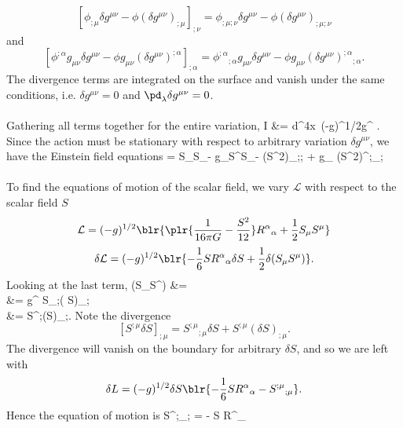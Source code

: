 \documentclass[10pt,letterpaper]{article}
\begin{document}
\[
	[\phi_{;\mu}\delta g^{\mu\nu}-\phi (\delta g^{\mu\nu})_{;\mu}]_{;\nu} = 
	\phi_{;\mu;\nu}\delta g^{\mu\nu}
	-\phi (\delta g^{\mu\nu})_{;\mu;\nu}
\]
and
\[
	[\phi^{;\alpha}g_{\mu\nu}\delta g^{\mu\nu} -\phi g_{\mu\nu}(\delta g^{\mu\nu})^{;\alpha}]_{;\alpha} = 
	\phi^{;\alpha}{}_{;\alpha}g_{\mu\nu}\delta g^{\mu\nu} - \phi g_{\mu\nu} (\delta g^{\mu\nu})^{;\alpha}{}_{;\alpha}.
\]
The divergence terms are integrated on the surface and vanish under the same conditions, i.e. $\delta g^{\mu\nu} = 0$ and $\pd_\lambda \delta g^{\mu\nu} = 0$. 
\\ \\
Gathering all terms together for the entire variation,
\ba
	\delta I &= \int d^4x\ (-g)^{1/2}\delta g^{\mu\nu}
	.
\ea
Since the action must be stationary with respect to arbitrary variation $\delta g^{\mu\nu}$, we 
have the Einstein field equations
\be
	 = S_\mu S_\nu -  g_{\mu\nu}S^\alpha S_\alpha-
	(S^2)_{;\mu;\nu} +  g_{\mu\nu} (S^2)^{;\alpha}{}_{;\alpha}\label{2}
\ee
\hrulefill \\ \\ 
To find the equations of motion of the scalar field, we vary $\mathcal L$ with respect to the scalar field $S$
\[
	\mathcal L = (-g)^{1/2}\blr{ \plr{ \frac{1}{16\pi G}-\frac{S^2}{12}}R^\alpha{}_\alpha +\frac12 S_\mu S^\mu}
\]
\[
	\delta \mathcal L = (-g)^{1/2}\blr{ -\frac16 SR^{\alpha}{}_\alpha\delta S+\frac12 \delta(S_\mu S^\mu)}.
\]
Looking at the last term,
\ba
	 \delta(S_\mu S^\mu) &= \delta {}\\
	&= g^{\mu\nu} S_{;\nu}( \delta S)_{;\mu}\\
	&=  S^{;\mu}(\delta S)_{;\mu}.
\ea
Note the divergence
\[
	[S^{;\mu} \delta S]_{;\mu} = S^{;\mu}{}_{;\mu}\delta S + S^{;\mu}(\delta S)_{;\mu}.
\]
The divergence will vanish on the boundary for arbitrary $\delta S$, and so we are left with 
\[
	\delta L = (-g)^{1/2}\delta S\blr{ -\frac16 SR^{\alpha}{}_\alpha-S^{;\mu}{}_{;\mu}}.
\]
Hence the equation of motion is
\be
	S^{;\mu}{}_{;\mu} = - S R^{\alpha}{}_\alpha\label{3}
\ee
\\ \\ \\
\end{document}
